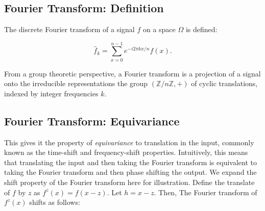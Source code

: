 \documentclass{article}
\begin{document}
\section{}

\subsection{Fourier Transform: Definition}

The discrete Fourier transform of a signal $f$ on a space $\Omega$ is defined:

\vspace{-0.5cm}
\begin{equation}
  \hat{f}_k = \sum_{x=0}^{n-1}e^{-i2\pi k x / n} f(x).
\end{equation}
\vspace{-0.5cm}

From a group theoretic perspective, a Fourier transform is a projection of a signal onto the irreducible representations the group $(\mathbb{Z}/n\mathbb{Z}, +)$ of cyclic translations, indexed by integer frequencies $k$.

\subsection{Fourier Transform: Equivariance}
This gives it the property of \textit{equivariance} to translation in the input, commonly known as the time-shift and frequency-shift properties. Intuitively, this means that translating the input and then taking the Fourier transform is equivalent to taking the Fourier transform and then phase shifting the output. We expand the shift property of the Fourier transform here for illustration. Define the translate of $f$ by $z$ as $f^z(x) = f(x - z)$. Let $ h = x - z$. Then, The Fourier transform of $f^z(x)$ shifts as follows:
\end{document}

